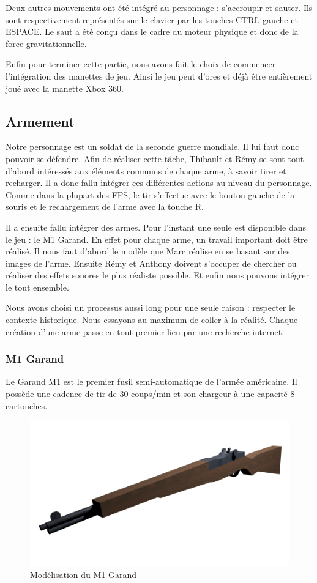 \documentclass[11pt]{report}
\begin{document}
Deux autres mouvements ont été intégré au personnage : s'accroupir et sauter. Ils sont respectivement représentés sur le clavier par les touches CTRL gauche et ESPACE. Le saut a été conçu dans le cadre du moteur physique et donc de la force gravitationnelle.

Enfin pour terminer cette partie, nous avons fait le choix de commencer l'intégration des manettes de jeu. Ainsi le jeu peut d'ores et déjà être entièrement joué avec la manette Xbox 360.

\subsection{Armement}

Notre personnage est un soldat de la seconde guerre mondiale. Il lui faut donc pouvoir se défendre. Afin de réaliser cette tâche, Thibault et Rémy se sont tout d'abord intéressés aux éléments communs de chaque arme, à savoir tirer et recharger. Il a donc fallu intégrer ces différentes actions au niveau du personnage. Comme dans la plupart des FPS, le tir s'effectue avec le bouton gauche de la souris et le rechargement de l'arme avec la touche R.

Il a ensuite fallu intégrer des armes. Pour l'instant une seule est disponible dans le jeu : le M1 Garand. En effet pour chaque arme, un travail important doit être réalisé. Il nous faut d'abord le modèle que Marc réalise en se basant sur des images de l'arme. Ensuite Rémy et Anthony doivent s'occuper de chercher ou réaliser des effets sonores le plus réaliste possible. Et enfin nous pouvons intégrer le tout ensemble. 

Nous avons choisi un processus aussi long pour une seule raison : respecter le contexte historique. Nous essayons au maximum de coller à la réalité. Chaque création d'une arme passe en tout premier lieu par une recherche internet.

\subsubsection*{M1 Garand}

Le Garand M1 est le premier fusil semi-automatique de l'armée américaine. Il possède une cadence de tir de 30 coups/min et son chargeur à une capacité 8 cartouches.

\begin{figure}[htbp]
\centering
\includegraphics[scale=0.55]{m1-garand.png}
\caption{Modélisation du M1 Garand}
\end{figure}
\end{document}
